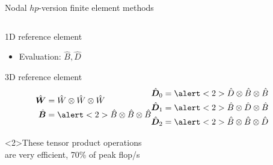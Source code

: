 \begin{frame}{Nodal $hp$-version finite element methods}
\begin{columns}
\begin{column}{0.6\textwidth}
\begin{block}{1D reference element}
\begin{itemize}
        \item Evaluation: $\hat B, \hat D$
        \end{itemize}
      \end{block}
      \vspace{-1em}
      \begin{block}{3D reference element}
      \vspace{-1em}
        \begin{align*}\label{eq:tprod}
          \begin{split}
            \hat{\bm W} &= \hat W \otimes \hat W \otimes \hat W \\
            \hat{\bm B} &= \alert<2>{\hat B \otimes \hat B \otimes \hat B} \\
          \end{split} &
          \begin{split}
            \hat{\bm D}_0 &= \alert<2>{\hat D \otimes \hat B \otimes \hat B} \\
            \hat{\bm D}_1 &= \alert<2>{\hat B \otimes \hat D \otimes \hat B} \\
            \hat{\bm D}_2 &= \alert<2>{\hat B \otimes \hat B \otimes \hat D} \\
          \end{split}
        \end{align*}
        \vspace{-1em}
        \begin{block}<2>{\alert{These tensor product operations \\ 
              are very efficient, 70\% of peak flop/s}}
        \end{block}
      \end{block}
    \end{column}
  \end{columns}
\end{frame}

